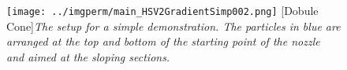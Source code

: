 \begin{figure}[H]
\centering
\texttt{[image: ../imgperm/main\_HSV2GradientSimp002.png]}
[Dobule Cone]{\textit{The setup for a simple demonstration. The particles in blue are arranged at the top and bottom of the starting point of the nozzle and aimed at the sloping sections.}}
\label{fig:main_HSV2GradientSimp002}
\end{figure}
